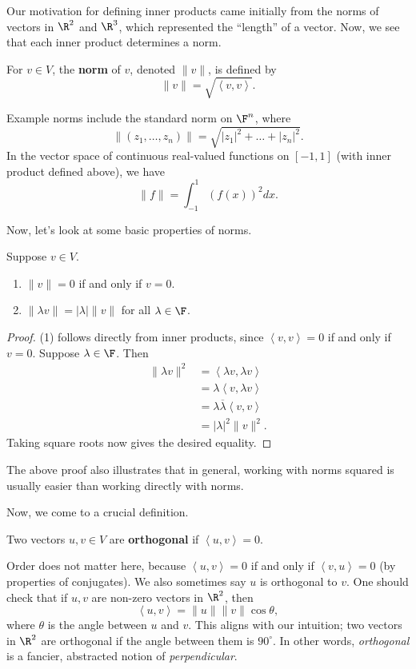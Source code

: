 \documentclass[math0540-lecture-notes.tex]{subfiles}
\begin{document}
Our motivation for defining inner products came initially from the norms of vectors in $\R^2$ and
$\R^3$, which represented the ``length'' of a vector. Now, we see that each inner product determines
a norm.
\begin{definition}[Norm]{}
  For $v\in V$, the \textbf{norm} of $v$, denoted $\|v\|$, is defined by \[
    \|v\|=\sqrt{\left<v,v \right>}
  .\] 
\end{definition}

Example norms include the standard norm on $\F^{n}$, where \[
  \|(z_1,\ldots,z_n)\|=\sqrt{\left| z_1 \right|^2+\ldots+\left| z_n \right| ^2 }
.\] In the vector space of continuous real-valued functions on $[-1,1]$ (with inner product defined
above), we have \[
  \|f\|=\int_{-1}^{1}(f(x))^2dx 
.\]

Now, let's look at some basic properties of norms.
\begin{proposition}{}
  Suppose $v\in V$.
  \begin{enumerate}
    \item $\|v\|=0$ if and only if $v=0$.
    \item $\|\lambda v\|=\left| \lambda \right| \|v\|$ for all $\lambda\in \F$.
  \end{enumerate}
\end{proposition}
\begin{proof}[Proof]
  (1) follows directly from inner products, since $\left<v,v \right> = 0$ if and only if $v=0$.
  Suppose $\lambda\in \F$. Then
  \begin{align*}
    \|\lambda v\|^2&=\left<\lambda v,\lambda v \right>\\
                   &= \lambda\left<v,\lambda v \right>\\
                   &=\lambda\overline{\lambda}\left<v,v \right>\\
                   &=\left| \lambda \right| ^2\|v\|^2
  .\end{align*} Taking square roots now gives the desired equality.
\end{proof}

The above proof also illustrates that in general, working with norms squared is usually easier than
working directly with norms.

Now, we come to a crucial definition.
\begin{definition}[Orthoganl]{}
  Two vectors $u,v\in V$ are \textbf{orthogonal} if $\left<u,v \right> =0$.
\end{definition}
Order does not matter here, because $\left<u,v \right>=0$ if and only if $\left<v,u  \right> = 0$
(by properties of conjugates).  We also sometimes say $u$ is orthogonal to $v$. One should check
that if $u,v$ are non-zero vectors in $\R^2$, then \[
  \left<u,v \right> = \|u\|\|v\|\cos{\theta}
,\] where $ \theta$ is the angle between $u$ and $v$. This aligns with our intuition; two vectors in
$\R^2$ are orthogonal if the angle between them is $90^{\circ}$. In other words, \textit{orthogonal}
is a fancier, abstracted notion of \textit{perpendicular}.
\end{document}
